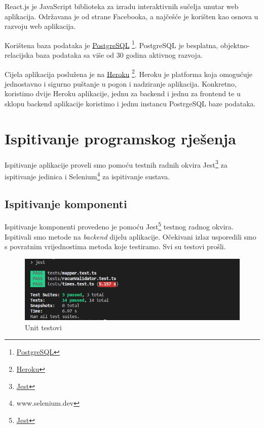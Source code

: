             React.js je JavaScript biblioteka za izradu interaktivnih sučelja unutar web aplikacija. Održavana je od strane Facebooka, a najčešće je korišten kao osnova u razvoju web aplikacija.
            
            Korištena baza podataka je \underline{PostgreSQL} \footnote{\href{https://www.postgresql.org/}{PostgreSQL}}. PostgreSQL je besplatna, objektno-relacijska baza podataka sa više od 30 godina aktivnog razvoja.
            
            Cijela aplikacija poslužena je na \underline{Heroku} \footnote{\href{https://www.heroku.com/home}{Heroku}}. Heroku je platforma koja omogućuje jednostavno i sigurno puštanje  u pogon i nadziranje aplikacija. Konkretno, koristimo dvije Heroku aplikacije, jednu za backend i jednu za frontend te u sklopu backend aplikacije koristimo i jednu instancu PostrgeSQL baze podataka.
			
			\eject 
		
	
		\section{Ispitivanje programskog rješenja}
			
			Ispitivanje aplikacije proveli smo pomoću testnih radnih okvira Jest\footnote{\href{https://jestjs.io/}{Jest}} za ispitivanje jedinica i Selenium\footnote{www.selenium.dev} za ispitivanje sustava.
	
			
			\subsection{Ispitivanje komponenti}
						
			Ispitivanje komponenti provedeno je pomoću
			Jest\footnote{\href{https://jestjs.io/}{Jest}} testnog radnog okvira. Ispitivali smo metode na \textit{backend} dijelu aplikacije. Očekivani izlaz usporedili smo s povratnim vrijednostima metoda koje testiramo. Svi su testovi prošli.
			
			
			\begin{figure}[H]
				\includegraphics[width=1\linewidth]{images/UnitTests.png}
				\caption{Unit testovi}
				\label{fig:Unit tests} 
			\end{figure}
			
